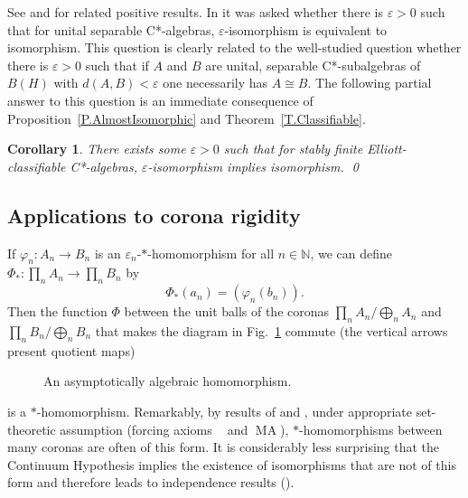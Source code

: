 \documentclass[11pt]{amsproc}
\newcommand{\bbN}{\mathbb N}
\newcommand{\cstar}{C*}
\DeclareMathOperator{\OCAT}{OCA_T}
\DeclareMathOperator{\MA}{MA}
\theoremstyle{definition}
\theoremstyle{plain}
\newtheorem{corollary}[definition]{Corollary}
\theoremstyle{remark}
\begin{document}
See \cite[Theorem~6.10]{CSSWW:Perturbations} and  \cite[Theorem~11 (i) and (iii)]{christensen2010spatial} for related positive results. 
In \cite[Question~5.8]{vignati2022rigidity} it was asked whether there is $\varepsilon>0$ such that for unital separable \cstar-algebras, $\varepsilon$-isomorphism is equivalent to isomorphism. This question is clearly related to the well-studied question whether there is $\varepsilon>0$ such that if $A$ and $B$ are unital, separable \cstar-subalgebras of $B(H)$ with $d(A,B)<\varepsilon$ one necessarily has $A\cong B$.  The following partial answer to this question is an immediate consequence of Proposition~\ref{P.AlmostIsomorphic} and Theorem~\ref{T.Classifiable}. 

\begin{corollary}
	\label{C.e-isomorphic} There exists some $\varepsilon>0$ such that for stably finite Elliott-classifiable \cstar-algebras, $\varepsilon$-isomorphism implies isomorphism. \qed 
\end{corollary}

\subsection{Applications to corona rigidity}\label{S.CoronaRigidity}

If $\varphi_n\colon A_n\to B_n$ is an $\varepsilon_n$-$*$-homomorphism for all $n\in \bbN$, we can define $\Phi_*\colon \prod_n A_n\to \prod_n B_n$ by 
\[
\Phi_*(a_n)=(\varphi_n(b_n)). 
\]
Then the function $\Phi$ between the unit balls of the coronas $\prod_n A_n/\bigoplus_n A_n$ and $\prod_n B_n/\bigoplus_n B_n$ that makes the diagram in Fig.~\ref{Fig.Lifting} commute (the vertical arrows present quotient maps)
\begin{figure}[h]
	\label{Fig.Lifting}
	\caption{An asymptotically algebraic homomorphism.}
\end{figure}
is a $*$-homomorphism. Remarkably, by results of \cite{mckenney2020forcing} and \cite{vignati2022rigidity}, under appropriate set-theoretic assumption (forcing axioms $\OCAT$ and $\MA$), $*$-homomorphisms between many coronas are often of this form. 
 It is considerably less surprising that the Continuum Hypothesis implies the existence of isomorphisms that are not of this form and therefore leads to independence results (\cite{ghasemi2014reduced}). 
 
\end{document}
